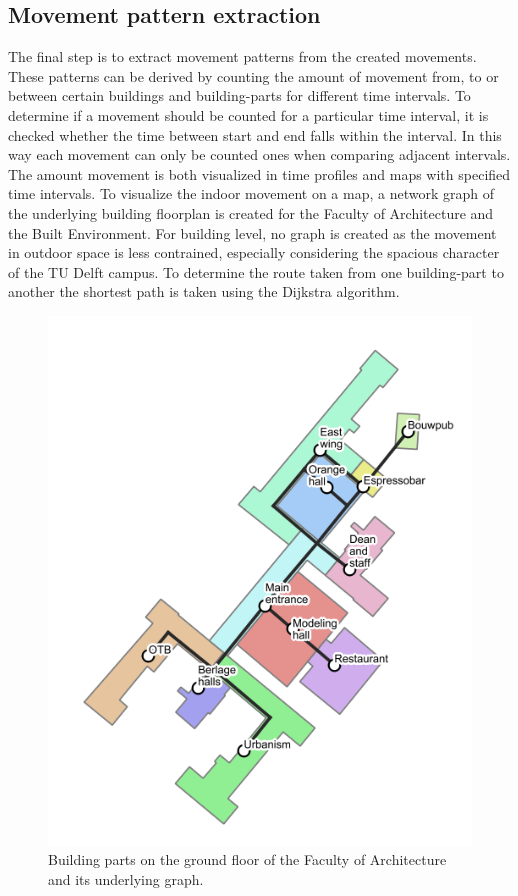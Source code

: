 \subsection{Movement pattern extraction}\label{ES-patternExtraction}
The final step is to extract movement patterns from the created movements. These patterns can be derived by counting the amount of movement from, to or between certain buildings and building-parts for different time intervals. To determine if a movement should be counted for a particular time interval, it is checked whether the time between start and end falls within the interval. In this way each movement can only be counted ones when comparing adjacent intervals. The amount movement is both visualized in time profiles and maps with specified time intervals. To visualize the indoor movement on a map, a network graph of the underlying building floorplan is created for the Faculty of Architecture and the Built Environment. For building level, no graph is created as the movement in outdoor space is less contrained, especially considering the spacious character of the TU Delft campus. To determine the route taken from one building-part to another the shortest path is taken using the Dijkstra algorithm.

\begin{figure}[H]
\centering
\includegraphics[scale=0.3]{bk_BG_bparts.png}
\captionsetup{justification=centering}
\caption{Building parts on the ground floor of the Faculty of Architecture and
its underlying graph.}
\label{figure:ES-bk_graph}
\end{figure}